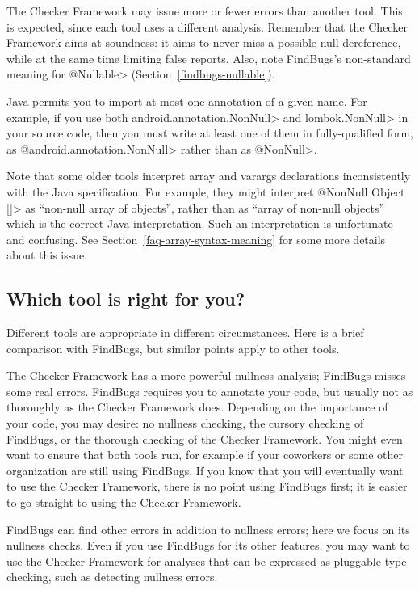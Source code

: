 The Checker Framework may issue more or fewer errors than another tool.
This is expected, since each tool uses a different analysis.  Remember that
the Checker Framework aims at soundness:  it aims to never miss a possible
null dereference, while at the same time limiting false reports.  Also,
note FindBugs's non-standard meaning for \<@Nullable>
(Section~\ref{findbugs-nullable}).

Java permits you to import at most one annotation of a given name.  For
example, if you use both \<android.annotation.NonNull> and
\<lombok.NonNull> in your source code, then you must write at least one of
them in fully-qualified form, as \<@android.annotation.NonNull> rather than
as \<@NonNull>.

Note that some older tools interpret array and varargs declarations
inconsistently with the Java specification.  For example, they might
interpret \<@NonNull Object []> as ``non-null array of objects'', rather
than as ``array of non-null objects'' which is the correct Java
interpretation.  Such an interpretation is unfortunate and confusing.  See
Section~\ref{faq-array-syntax-meaning} for some more details about this
issue.


\subsection{Which tool is right for you?\label{choosing-nullness-tool}}

Different tools are appropriate in different circumstances.  Here is a
brief comparison with FindBugs, but similar points apply to other tools.

The Checker Framework has a more powerful nullness analysis; FindBugs misses
some real
errors.  FindBugs requires you to annotate your code, but usually not as
thoroughly as the Checker Framework does.  Depending on the importance of
your code, you may desire:  no nullness checking, the cursory checking of
FindBugs, or the thorough checking of the Checker Framework.  You might
even want to ensure that both tools run, for example if your coworkers or
some other organization are still using FindBugs.  If you know that you
will eventually want to use the Checker Framework, there is no point using
FindBugs first; it is easier to go straight to using the Checker Framework.

FindBugs can find other errors in addition to nullness errors; here
we focus on its nullness checks.  Even if you use FindBugs for its other
features, you may want to use the Checker Framework for analyses that can
be expressed as pluggable type-checking, such as detecting nullness errors.

